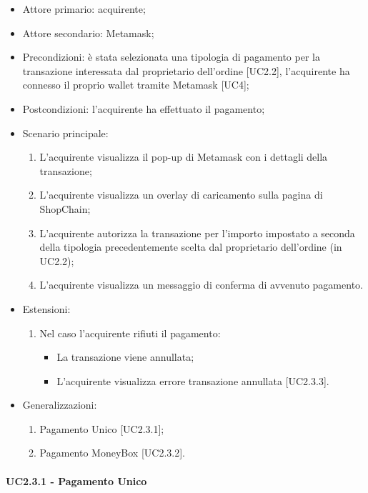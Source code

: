 \begin{itemize}
    \item Attore primario: acquirente;
    \item Attore secondario: Metamask\glo{};
    \item Precondizioni: è stata selezionata una tipologia di pagamento per la transazione interessata dal proprietario dell'ordine [UC2.2], 
            l'acquirente ha connesso il proprio wallet\glo{} tramite Metamask\glo{} [UC4];
    \item Postcondizioni: l'acquirente ha effettuato il pagamento;
    \item Scenario principale:
          \begin{enumerate}
              \item L'acquirente visualizza il pop-up di Metamask\glo{} con i dettagli della transazione;
              \item L'acquirente visualizza un overlay di caricamento sulla pagina di ShopChain;
              \item L'acquirente autorizza la transazione per l'importo impostato a seconda della tipologia precedentemente scelta dal proprietario dell'ordine (in UC2.2);
              \item L'acquirente visualizza un messaggio di conferma di avvenuto pagamento.
          \end{enumerate}
    \item Estensioni:
          \begin{enumerate}
              \item Nel caso l'acquirente rifiuti il pagamento:
              \begin{itemize}
                  \item La transazione viene annullata;
                  \item L'acquirente visualizza errore transazione annullata [UC2.3.3].
              \end{itemize}
          \end{enumerate}
    \item Generalizzazioni:
          \begin{enumerate}
              \item Pagamento Unico [UC2.3.1];
              \item Pagamento MoneyBox\glo{} [UC2.3.2].
          \end{enumerate}
\end{itemize}

\paragraph{UC2.3.1 - Pagamento Unico}

